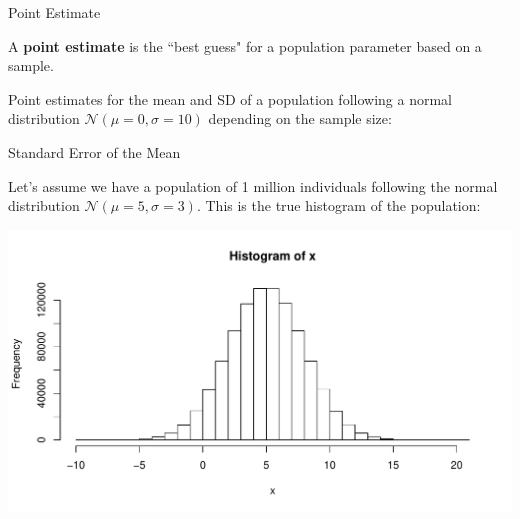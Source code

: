 \begin{frame}{Point Estimate}

    A \textbf{point estimate} is the ``best guess" for a population parameter based on a sample.
    
    \begin{example}
        \medskip
        Point estimates for the mean and SD of a population following a normal distribution $\mathcal{N}(\mu = 0, \sigma = 10)$ depending on the sample size:
    \end{example}

\end{frame}

\begin{frame}{Standard Error of the Mean}

    Let's assume we have a population of 1 million individuals following the normal distribution $\mathcal{N}(\mu = 5, \sigma = 3)$. This is the true histogram of the population:

    \includegraphics[width=\linewidth]{R/plots/se-population}

\end{frame}

